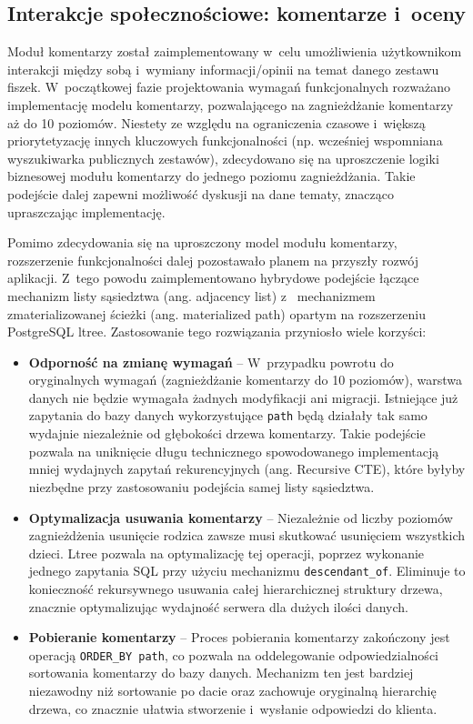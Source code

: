 \subsection{Interakcje społecznościowe: komentarze i~oceny}
Moduł komentarzy został zaimplementowany w~celu umożliwienia użytkownikom interakcji między sobą i~wymiany informacji/opinii na temat danego 
zestawu fiszek. W~początkowej fazie projektowania wymagań funkcjonalnych rozważano implementację modelu komentarzy, pozwalającego na 
zagnieżdżanie komentarzy aż do 10 poziomów. Niestety ze względu na ograniczenia czasowe i~większą priorytetyzację innych kluczowych 
funkcjonalności (np. wcześniej wspomniana wyszukiwarka publicznych zestawów), zdecydowano się na uproszczenie logiki biznesowej modułu komentarzy do 
jednego poziomu zagnieżdżania. Takie podejście dalej zapewni możliwość dyskusji na dane tematy, znacząco upraszczając implementację.

Pomimo zdecydowania się na uproszczony model modułu komentarzy, rozszerzenie funkcjonalności dalej pozostawało planem na przyszły 
rozwój aplikacji. Z~tego powodu zaimplementowano hybrydowe podejście łączące mechanizm listy sąsiedztwa (ang. adjacency list) z~
mechanizmem zmaterializowanej ścieżki (ang. materialized path) opartym na rozszerzeniu PostgreSQL ltree. 
Zastosowanie tego rozwiązania przyniosło wiele korzyści:

\begin{itemize}
    \item \textbf{Odporność na zmianę wymagań} -- W~przypadku powrotu do oryginalnych wymagań (zagnieżdżanie komentarzy do 10 poziomów),
    warstwa danych nie będzie wymagała żadnych modyfikacji ani migracji. Istniejące już zapytania do bazy danych wykorzystujące \texttt{path}
    będą działały tak samo wydajnie niezależnie od głębokości drzewa komentarzy. Takie podejście pozwala na uniknięcie długu technicznego 
    spowodowanego implementacją mniej wydajnych zapytań rekurencyjnych (ang. Recursive CTE), które byłyby niezbędne przy zastosowaniu podejścia 
    samej listy sąsiedztwa.
    \item \textbf{Optymalizacja usuwania komentarzy} -- Niezależnie od liczby poziomów zagnieżdżenia usunięcie rodzica zawsze musi skutkować 
    usunięciem wszystkich dzieci. Ltree pozwala na optymalizację tej operacji, poprzez wykonanie jednego zapytania SQL przy użyciu mechanizmu 
    \texttt{descendant\_of}. Eliminuje to konieczność rekursywnego usuwania całej hierarchicznej struktury drzewa, znacznie optymalizując 
    wydajność serwera dla dużych ilości danych.
    \item \textbf{Pobieranie komentarzy} -- Proces pobierania komentarzy zakończony jest operacją \texttt{ORDER\_BY path}, co pozwala  na 
    oddelegowanie odpowiedzialności sortowania komentarzy do bazy danych. Mechanizm ten jest bardziej niezawodny niż sortowanie
    po dacie oraz zachowuje oryginalną hierarchię drzewa, co znacznie ułatwia stworzenie i~wysłanie odpowiedzi do klienta.
\end{itemize}

